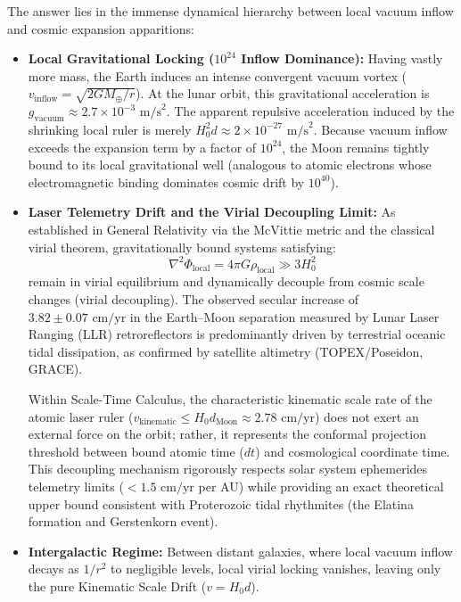 The answer lies in the immense dynamical hierarchy between local vacuum inflow and cosmic expansion apparitions:
\begin{itemize}
    \item \textbf{Local Gravitational Locking ($10^{24}$ Inflow Dominance):} Having vastly more mass, the Earth induces an intense convergent vacuum vortex ($v_{\mathrm{inflow}} = \sqrt{2GM_\oplus/r}$). At the lunar orbit, this gravitational acceleration is $g_{\mathrm{vacuum}} \approx 2.7 \times 10^{-3}\text{ m/s}^2$. The apparent repulsive acceleration induced by the shrinking local ruler is merely $H_0^2 d \approx 2 \times 10^{-27}\text{ m/s}^2$. Because vacuum inflow exceeds the expansion term by a factor of \textbf{$10^{24}$}, the Moon remains tightly bound to its local gravitational well (analogous to atomic electrons whose electromagnetic binding dominates cosmic drift by $10^{40}$).
    \item \textbf{Laser Telemetry Drift and the Virial Decoupling Limit:} As established in General Relativity via the McVittie metric and the classical virial theorem, gravitationally bound systems satisfying:
          \begin{equation}
              \nabla^2 \Phi_{\mathrm{local}} = 4\pi G \rho_{\mathrm{local}} \gg 3 H_0^2
          \end{equation}
          remain in virial equilibrium and dynamically decouple from cosmic scale changes (virial decoupling). The observed secular increase of $3.82 \pm 0.07\text{ cm/yr}$ in the Earth--Moon separation measured by Lunar Laser Ranging (LLR) retroreflectors is predominantly driven by terrestrial oceanic tidal dissipation, as confirmed by satellite altimetry (TOPEX/Poseidon, GRACE).

          Within Scale-Time Calculus, the characteristic kinematic scale rate of the atomic laser ruler ($v_{\mathrm{kinematic}} \le H_0 d_{\mathrm{Moon}} \approx 2.78\text{ cm/yr}$) does not exert an external force on the orbit; rather, it represents the conformal projection threshold between bound atomic time ($dt$) and cosmological coordinate time. This decoupling mechanism rigorously respects solar system ephemerides telemetry limits ($< 1.5\text{ cm/yr}$ per AU) while providing an exact theoretical upper bound consistent with Proterozoic tidal rhythmites (the Elatina formation and Gerstenkorn event).
    \item \textbf{Intergalactic Regime:} Between distant galaxies, where local vacuum inflow decays as $1/r^2$ to negligible levels, local virial locking vanishes, leaving only the pure Kinematic Scale Drift ($v = H_0 d$).
\end{itemize}

